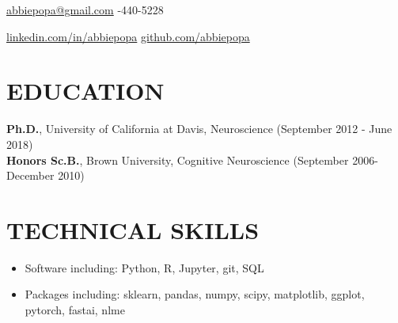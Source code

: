 \documentclass[line,margin,10pt]{res}
\begin{document}
 
\begin{resume}
\hoffset\centerline 
{\hyperref[abbiepopa@gmail.com]{abbiepopa@gmail.com} \quad \quad \quad \quad  \quad \quad \quad \quad \quad \quad \quad \quad \quad \quad \quad \quad \quad \quad \quad \quad \quad\quad \quad \quad \quad \quad \quad \quad \quad \quad \quad \quad  \quad \quad {}-440-5228}
\hoffset\centerline 
{\hspace{0.05cm} \hyperref[linkedin.com/in/abbiepopa]{linkedin.com/in/abbiepopa} \quad \quad \quad \quad \quad \quad \quad \quad \quad \quad \quad\quad \quad \quad \quad \quad \quad \quad \quad \quad \quad \quad  \quad \quad \quad  \quad \quad \quad   \quad \hyperref[github.com/abbiepopa]{github.com/abbiepopa}}
 
\section{EDUCATION} 
\textbf{Ph.D.}, University of California at Davis, Neuroscience \hfill (September 2012 - June 2018)\\
\textbf{Honors Sc.B.}, Brown University, Cognitive Neuroscience \hfill (September 2006-December 2010)\\

 \section{TECHNICAL SKILLS} 
 \begin{itemize}[leftmargin=-2pt] \itemsep -2pt
\item [] Software including: Python, R, Jupyter, git, SQL
\item []Packages including: sklearn, pandas, numpy, scipy, matplotlib, ggplot, pytorch, fastai, nlme
 \end{itemize}


\end{resume}
\end{document}
